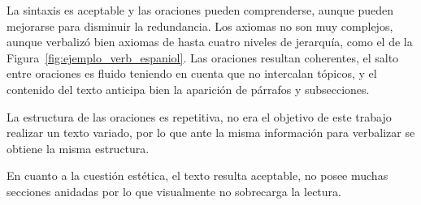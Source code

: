 La sintaxis es aceptable y las oraciones pueden comprenderse, aunque pueden mejorarse para disminuir la redundancia. Los axiomas no son muy complejos, aunque verbalizó bien axiomas de hasta cuatro niveles de jerarquía, como el de la Figura~\ref{fig:ejemplo_verb_espaniol}. Las oraciones resultan coherentes, el salto entre oraciones es fluido teniendo en cuenta que no intercalan tópicos, y el contenido del texto anticipa bien la aparición de párrafos y subsecciones.

La estructura de las oraciones es repetitiva, no era el objetivo de este trabajo realizar un texto variado, por lo que ante la misma información para verbalizar se obtiene la misma estructura.

En cuanto a la cuestión estética, el texto resulta aceptable, no posee muchas secciones anidadas por lo que visualmente no sobrecarga la lectura.

